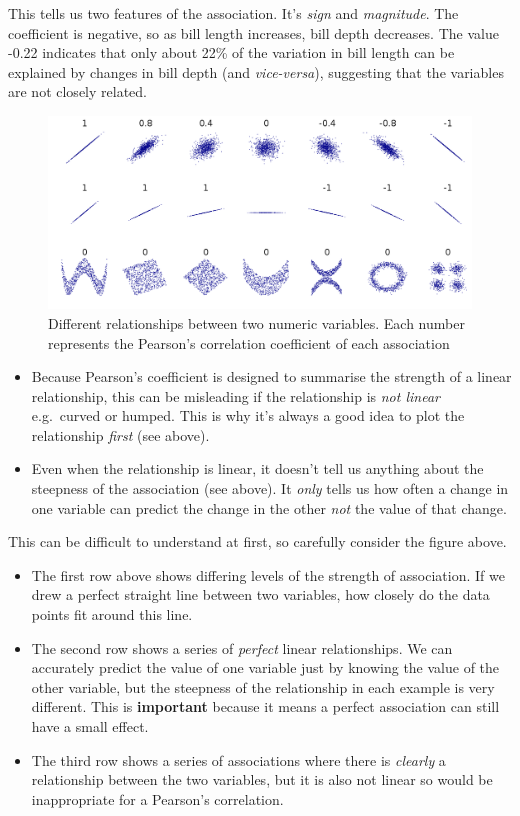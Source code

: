 \documentclass[
]{book}
\begin{document}
This tells us two features of the association. It's \emph{sign} and \emph{magnitude}. The coefficient is negative, so as bill length increases, bill depth decreases. The value -0.22 indicates that only about 22\% of the variation in bill length can be explained by changes in bill depth (and \emph{vice-versa}), suggesting that the variables are not closely related.

\begin{figure}
\includegraphics[width=0.8\linewidth]{images/correlation_examples} \caption{Different relationships between two numeric variables. Each number represents the Pearson's correlation coefficient of each association}\label{fig:unnamed-chunk-310}
\end{figure}

\begin{itemize}
\item
  Because Pearson's coefficient is designed to summarise the strength of a linear relationship, this can be misleading if the relationship is \emph{not linear} e.g.~curved or humped. This is why it's always a good idea to plot the relationship \emph{first} (see above).
\item
  Even when the relationship is linear, it doesn't tell us anything about the steepness of the association (see above). It \emph{only} tells us how often a change in one variable can predict the change in the other \emph{not} the value of that change.
\end{itemize}

This can be difficult to understand at first, so carefully consider the figure above.

\begin{itemize}
\item
  The first row above shows differing levels of the strength of association. If we drew a perfect straight line between two variables, how closely do the data points fit around this line.
\item
  The second row shows a series of \emph{perfect} linear relationships. We can accurately predict the value of one variable just by knowing the value of the other variable, but the steepness of the relationship in each example is very different. This is \textbf{important} because it means a perfect association can still have a small effect.
\item
  The third row shows a series of associations where there is \emph{clearly} a relationship between the two variables, but it is also not linear so would be inappropriate for a Pearson's correlation.
\end{itemize}
\end{document}
